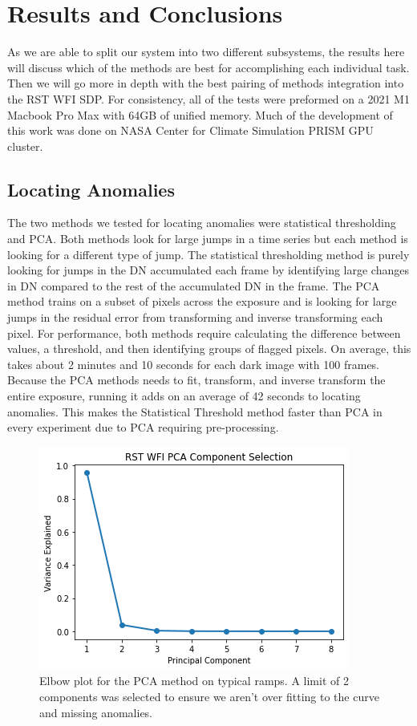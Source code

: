 \section{Results and Conclusions}
\label{rst/sec:results}

As we are able to split our system into two different subsystems, the results here will discuss which of the methods are best for accomplishing each individual task. 
Then we will go more in depth with the best pairing of methods integration into the RST WFI SDP. 
For consistency, all of the tests were preformed on a 2021 M1 Macbook Pro Max with 64GB of unified memory.
Much of the development of this work was done on NASA Center for Climate Simulation PRISM GPU cluster. 

\subsection{Locating Anomalies}
The two methods we tested for locating anomalies were statistical thresholding and PCA.
Both methods look for large jumps in a time series but each method is looking for a different type of jump.
The statistical thresholding method is purely looking for jumps in the DN accumulated each frame by identifying large changes in DN compared to the rest of the accumulated DN in the frame. 
The PCA method trains on a subset of pixels across the exposure and is looking for large jumps in the residual error from transforming and inverse transforming each pixel. 
For performance, both methods require calculating the difference between values, a threshold, and then identifying groups of flagged pixels. 
On average, this takes about 2 minutes and 10 seconds for each dark image with 100 frames. 
Because the PCA methods needs to fit, transform, and inverse transform the entire exposure, running it adds on an average of 42 seconds to locating anomalies. 
This makes the Statistical Threshold method faster than PCA in every experiment due to PCA requiring pre-processing. 

\begin{figure}
    \centering
    \includegraphics[width=.5\linewidth]{figs/rst/elbow.png}
    \caption[Elbow Plot of PCA for Typical Ramps in WFI Detector Data]{Elbow plot for the PCA method on typical ramps. A limit of 2 components was selected to ensure we aren't over fitting to the curve and missing anomalies.}
    \label{rst/fig:elbow}
\end{figure}

